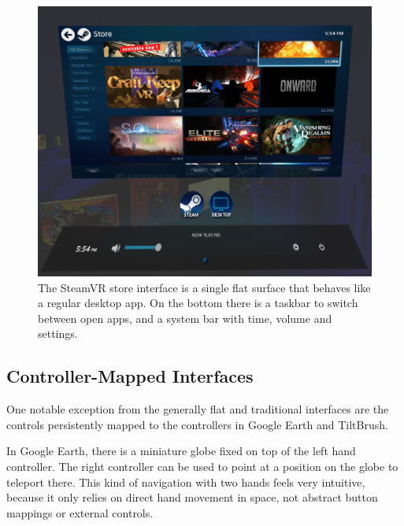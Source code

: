 \documentclass{tufte-book} %
\begin{document}
\begin{figure}
  \includegraphics{steamstore.png}
  \caption{The SteamVR store interface is a single flat surface that behaves like a regular desktop app. On the bottom there is a taskbar to switch between open apps, and a system bar with time, volume and settings.}
  \label{fig:steamstore}
\end{figure}



\subsection{Controller-Mapped Interfaces}
One notable exception from the generally flat and traditional interfaces are the controls persistently mapped to the controllers in Google Earth and TiltBrush.

In Google Earth, there is a miniature globe fixed on top of the left hand controller. The right controller can be used to point at a position on the globe to teleport there. This kind of navigation with two hands feels very intuitive, because it only relies on direct hand movement in space, not abstract button mappings or external controls.
\end{document}
